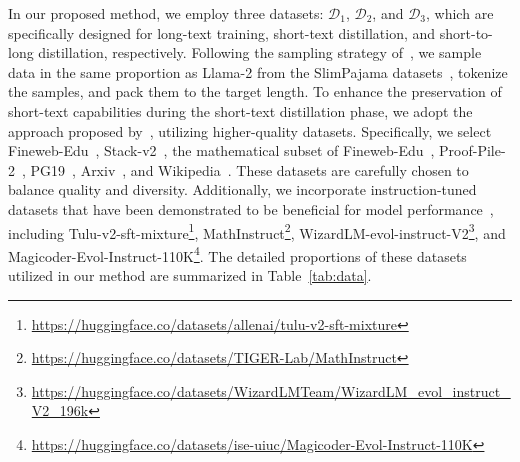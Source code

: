 In our proposed method, we employ three datasets: $\mathcal{D}_1$, $\mathcal{D}_2$, and $\mathcal{D}_3$, which are specifically designed for long-text training, short-text distillation, and short-to-long distillation, respectively. Following the sampling strategy of~\citet{fu-icml-2024-data}, we sample data in the same proportion as Llama-2 from the SlimPajama datasets~\cite{soboleva-huggingface-2023-slimpajama}, tokenize the samples, and pack them to the target length. To enhance the preservation of short-text capabilities during the short-text distillation phase, we adopt the approach proposed by~\cite{gao-arxiv-2024-how}, utilizing higher-quality datasets. Specifically, we select Fineweb-Edu~\cite{penedo-arxiv-2024-fineweb}, Stack-v2~\cite{Lozhkov-arxiv-2024-stack}, the mathematical subset of Fineweb-Edu~\cite{penedo-arxiv-2024-fineweb}, Proof-Pile-2~\cite{Azerbayev-ICLR-2024-proof}, PG19~\cite{rae-iclr-2020-pg19}, Arxiv~\cite{soboleva-huggingface-2023-slimpajama}, and Wikipedia~\cite{soboleva-huggingface-2023-slimpajama}. These datasets are carefully chosen to balance quality and diversity.
Additionally, we incorporate instruction-tuned datasets that have been demonstrated to be beneficial for model performance~\cite{hu-arxiv-2024-minicpm}, including Tulu-v2-sft-mixture\footnote{\url{https://huggingface.co/datasets/allenai/tulu-v2-sft-mixture}}, MathInstruct\footnote{\url{https://huggingface.co/datasets/TIGER-Lab/MathInstruct}}, WizardLM-evol-instruct-V2\footnote{\url{https://huggingface.co/datasets/WizardLMTeam/WizardLM\_evol\_instruct\_V2\_196k}}, and Magicoder-Evol-Instruct-110K\footnote{\url{https://huggingface.co/datasets/ise-uiuc/Magicoder-Evol-Instruct-110K}}. The detailed proportions of these datasets utilized in our method are summarized in Table~\ref{tab:data}.

\begin{table}[htb]
    \centering
    \caption{Data Mixture of three datasets.}
    \label{tab:data}
\end{table}

